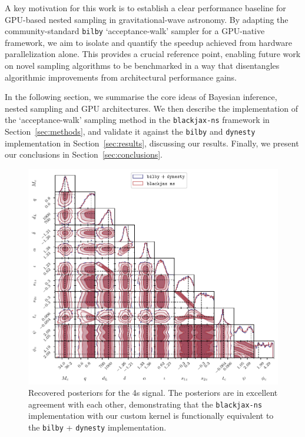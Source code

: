 \documentclass[fleqn,usenatbib]{mnras}
\begin{document}
A key motivation for this work is to establish a clear performance
baseline for GPU-based nested sampling in gravitational-wave astronomy.
By adapting the community-standard \texttt{bilby}
`acceptance-walk' sampler for a GPU-native framework, we aim to isolate
and quantify the speedup achieved from hardware parallelization alone.
This provides a crucial reference point, enabling future work on novel
sampling algorithms to be benchmarked in a way that disentangles
algorithmic improvements from architectural performance gains.

In the following section, we summarise the core ideas
of Bayesian inference, nested sampling and GPU architectures.
We then describe the implementation of the `acceptance-walk' sampling
method in the \texttt{blackjax-ns} framework in Section~\ref{sec:methods}, and validate it against
the \texttt{bilby} and \texttt{dynesty} implementation in Section~\ref{sec:results}, discussing
our results. Finally, we present our conclusions in Section~\ref{sec:conclusions}.

\begin{figure}
    \centering
    \includegraphics{figures/bilby_blackjax_comparison_4s.pdf}
    \caption{Recovered posteriors for the 4s signal. The posteriors are in excellent agreement with each other, demonstrating that the
    \texttt{blackjax-ns} implementation with our custom kernel is functionally equivalent to the \texttt{bilby} + \texttt{dynesty} implementation.}
    \label{fig:4s_posteriors}
\end{figure}
\end{document}
